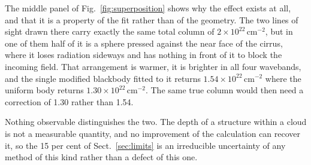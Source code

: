 The middle panel of Fig.~\ref{fig:superposition} shows why the effect exists at all, and that it is a property of the fit rather
than of the geometry. The two lines of sight drawn there carry exactly the same total column of $2{\times}10^{22}$\,cm$^{-2}$, but
in one of them half of it is a sphere pressed against the near face of the cirrus, where it loses radiation sideways and has
nothing in front of it to block the incoming field. That arrangement is warmer, it is brighter in all four wavebands, and the
single modified blackbody fitted to it returns $1.54{\times}10^{22}$\,cm$^{-2}$ where the uniform body returns
$1.30{\times}10^{22}$\,cm$^{-2}$. The same true column would then need a correction of 1.30 rather than 1.54.

Nothing observable distinguishes the two. The depth of a structure within a cloud is not a measurable quantity, and no
improvement of the calculation can recover it, so the 15 per cent of Sect.~\ref{sec:limits} is an irreducible uncertainty of any
method of this kind rather than a defect of this one.
